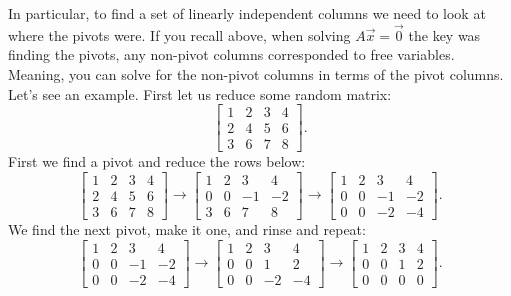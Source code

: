 In particular, to find a set of linearly independent columns we need to
look at where the pivots were.  If you recall above, when solving $A \vec{x}
= \vec{0}$ the key was finding the pivots, any non-pivot columns corresponded to
free variables.  Meaning, you can solve for the non-pivot columns in terms
of the pivot columns.  Let's see an example.  First let us reduce some
random matrix:
\begin{equation*}
\begin{bmatrix}
1 & 2 & 3 & 4 \\
2 & 4 & 5 & 6 \\
3 & 6 & 7 & 8
\end{bmatrix} .
\end{equation*}
First we find a pivot and reduce the rows below:
\begin{equation*}
\begin{bmatrix}
\boxed{1} & 2 & 3 & 4 \\
2 & 4 & 5 & 6 \\
3 & 6 & 7 & 8
\end{bmatrix} 
\to
\begin{bmatrix}
\boxed{1} & 2 & 3 & 4 \\
0 & 0 & -1 & -2 \\
3 & 6 & 7 & 8
\end{bmatrix} 
\to
\begin{bmatrix}
\boxed{1} & 2 & 3 & 4 \\
0 & 0 & -1 & -2 \\
0 & 0 & -2 & -4
\end{bmatrix} .
\end{equation*}
We find the next pivot, make it one, and rinse and repeat:
\begin{equation*}
\begin{bmatrix}
\boxed{1} & 2 & 3 & 4 \\
0 & 0 & \boxed{-1} & -2 \\
0 & 0 & -2 & -4
\end{bmatrix} 
\to
\begin{bmatrix}
\boxed{1} & 2 & 3 & 4 \\
0 & 0 & \boxed{1} & 2 \\
0 & 0 & -2 & -4
\end{bmatrix} 
\to
\begin{bmatrix}
\boxed{1} & 2 & 3 & 4 \\
0 & 0 & \boxed{1} & 2 \\
0 & 0 & 0 & 0
\end{bmatrix} . 
\end{equation*}
